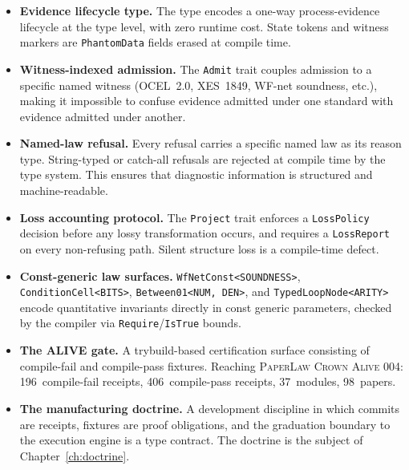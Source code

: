 \begin{itemize}
  \item \textbf{Evidence lifecycle type.} The  type
        encodes a one-way process-evidence lifecycle at the type level, with
        zero runtime cost. State tokens and witness markers are
        \texttt{PhantomData} fields erased at compile time.

  \item \textbf{Witness-indexed admission.} The \texttt{Admit} trait couples
        admission to a specific named witness (OCEL~2.0, XES~1849, WF-net
        soundness, etc.), making it impossible to confuse evidence admitted
        under one standard with evidence admitted under another.

  \item \textbf{Named-law refusal.} Every refusal carries a specific named law
        as its reason type. String-typed or catch-all refusals are rejected at
        compile time by the type system. This ensures that diagnostic
        information is structured and machine-readable.

  \item \textbf{Loss accounting protocol.} The \texttt{Project} trait enforces
        a \texttt{LossPolicy} decision before any lossy transformation occurs,
        and requires a \texttt{LossReport} on every non-refusing path. Silent
        structure loss is a compile-time defect.

  \item \textbf{Const-generic law surfaces.} \texttt{WfNetConst<SOUNDNESS>},
        \texttt{ConditionCell<BITS>}, \texttt{Between01<NUM, DEN>}, and
        \texttt{TypedLoopNode<ARITY>} encode quantitative invariants directly
        in const generic parameters, checked by the compiler via
        \texttt{Require}/\texttt{IsTrue} bounds.

  \item \textbf{The ALIVE gate.} A trybuild-based certification surface
        consisting of compile-fail and compile-pass fixtures. Reaching
        \textsc{PaperLaw Crown Alive 004}: 196~compile-fail receipts,
        406~compile-pass receipts, 37~modules, 98~papers.

  \item \textbf{The manufacturing doctrine.} A development discipline in
        which commits are receipts, fixtures are proof obligations, and the
        graduation boundary to the execution engine is a type contract. The
        doctrine is the subject of Chapter~\ref{ch:doctrine}.
\end{itemize}

